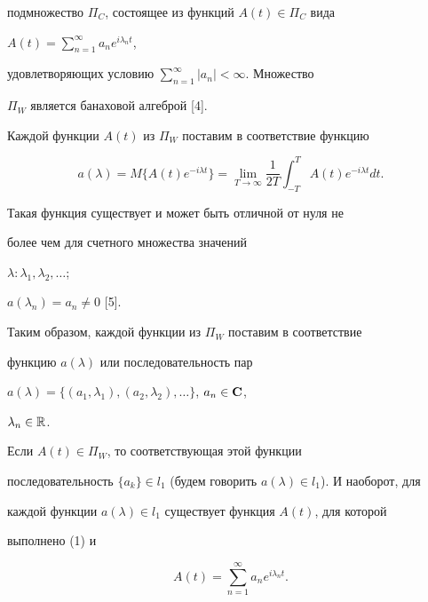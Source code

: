 подмножество $\Pi_C$, состоящее из функций $A(t)\in\Pi_C$ вида 


$A(t)=\sum\limits^\infty_{n=1}a_n e^{i\lambda_n t}$, 


удовлетворяющих условию $\sum\limits^\infty_{n=1}|a_n|<\infty$. Множество 


$\Pi_W$ является банаховой алгеброй [4]. 


 


Каждой функции $A(t)$ из $\Pi_W$ поставим в соответствие функцию 


\begin{equation} 


a(\lambda)=M\{A(t)e^{-i\lambda t}\}=\lim_{T\to\infty} 


\frac{1}{2T}\int^T_{-T}A(t)e^{-i\lambda t}d t. 


\end{equation} 


Такая функция существует и может быть отличной от нуля не 


более чем для счетного множества значений 


$\lambda:\lambda_1,\lambda_2,\dotsc$; 


$a(\lambda_n)=a_n\ne0$ [5]. 


Таким образом, каждой функции из $\Pi_W$ поставим в соответствие 


функцию $a(\lambda)$ или последовательность пар 


$a(\lambda)=\{(a_1,\lambda_1),(a_2,\lambda_2),\dotsc\}$, $a_n\in\bold C$, 


$\lambda_n\in\Bbb R$. 


 


Если $A(t)\in\Pi_W$, то соответствующая этой функции 


последовательность $\{a_k\}\in l_1$ (будем говорить $a(\lambda)\in 


l_1$). И наоборот, для 


каждой функции $a(\lambda)\in l_1$ существует функция $A(t)$, для которой 


выполнено (1) и 


\begin{equation} 


A(t)=\sum^\infty_{n=1}a_n e^{i\lambda_n t}. 


\end{equation} 


 



